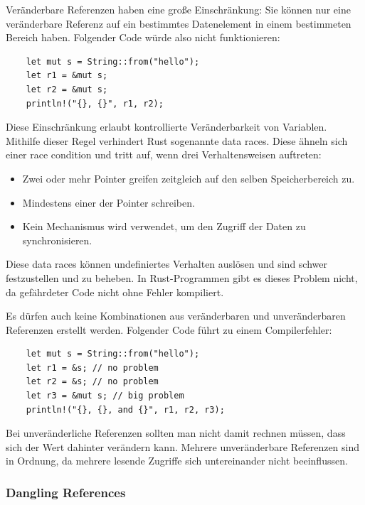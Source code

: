 Veränderbare Referenzen haben eine große Einschränkung: Sie können nur eine veränderbare Referenz auf ein bestimmtes Datenelement in einem bestimmeten Bereich haben. Folgender Code würde also nicht funktionieren:

\begin{lstlisting}
    let mut s = String::from("hello");
    let r1 = &mut s;
    let r2 = &mut s;
    println!("{}, {}", r1, r2);
\end{lstlisting}

Diese Einschränkung erlaubt kontrollierte Veränderbarkeit von Variablen. Mithilfe dieser Regel verhindert Rust sogenannte \glqq data races\grqq{}. Diese ähneln sich einer \glqq race condition\grqq{} und tritt auf, wenn drei Verhaltensweisen auftreten:

\begin{itemize}
    \item Zwei oder mehr Pointer greifen zeitgleich auf den selben Speicherbereich zu.
    \item Mindestens einer der Pointer schreiben.
    \item Kein Mechanismus wird verwendet, um den Zugriff der Daten zu synchronisieren.
\end{itemize}

Diese \glqq data races\grqq{} können undefiniertes Verhalten auslösen und sind schwer festzustellen und zu beheben. In Rust-Programmen gibt es dieses Problem nicht, da gefährdeter Code nicht ohne Fehler kompiliert.

Es dürfen auch keine Kombinationen aus veränderbaren und unveränderbaren Referenzen erstellt werden. Folgender Code führt zu einem Compilerfehler:

\begin{lstlisting}
    let mut s = String::from("hello");
    let r1 = &s; // no problem
    let r2 = &s; // no problem
    let r3 = &mut s; // big problem
    println!("{}, {}, and {}", r1, r2, r3);
\end{lstlisting}

Bei unveränderliche Referenzen sollten man nicht damit rechnen müssen, dass sich der Wert dahinter verändern kann. Mehrere unveränderbare Referenzen sind in Ordnung, da mehrere lesende Zugriffe sich untereinander nicht beeinflussen.

\subsubsection{\glqq Dangling References\grqq{}}

